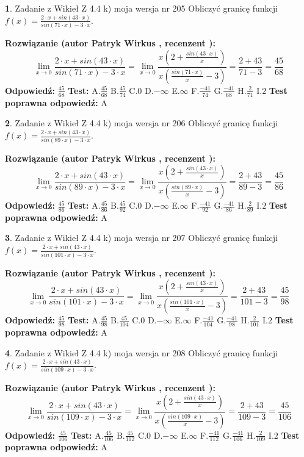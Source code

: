 \documentclass[12pt, a4paper]{article}
\theoremstyle{definition} %
\newtheorem{zad}{}
\newcommand{\zadStart}[1]{\begin{zad}#1\newline}
\newcommand{\zadStop}{\end{zad}}
\newcommand{\rozwStart}[2]{\noindent \textbf{Rozwiązanie (autor #1 , recenzent #2): }\newline}
\newcommand{\rozwStop}{\newline}
\newcommand{\odpStart}{\noindent \textbf{Odpowiedź:}\newline}
\newcommand{\odpStop}{\newline}
\newcommand{\testStart}{\noindent \textbf{Test:}\newline}
\newcommand{\testStop}{\newline}
\newcommand{\kluczStart}{\noindent \textbf{Test poprawna odpowiedź:}\newline}
\newcommand{\kluczStop}{\newline}
\begin{document}
\zadStart{Zadanie z Wikieł Z 4.4 k) moja wersja nr 205}
Obliczyć granicę funkcji $f(x)=\frac{2\cdot x +sin(43\cdot x)}{sin(71\cdot x) -3\cdot x}$.
\zadStop
\rozwStart{Patryk Wirkus}{}
$$\lim\limits_{x\to 0}\frac{2\cdot x +sin(43\cdot x)}{sin(71\cdot x) -3\cdot x}
=\lim\limits_{x\to 0}\frac{x(2+\frac{sin(43\cdot x)}{x})}{x(\frac{sin(71\cdot x)}{x}-3)}
=\frac{2+43}{71-3} = \frac{45}{68}$$
\rozwStop
\odpStart
$\frac{45}{68}$
\odpStop
\testStart
A.$\frac{45}{68}$
B.$\frac{45}{74}$
C.$0$
D.$-\infty$
E.$\infty$
F.$\frac{-41}{74}$
G.$\frac{-41}{68}$
H.$\frac{2}{71}$
I.$2$
\testStop
\kluczStart
A
\kluczStop



\zadStart{Zadanie z Wikieł Z 4.4 k) moja wersja nr 206}
Obliczyć granicę funkcji $f(x)=\frac{2\cdot x +sin(43\cdot x)}{sin(89\cdot x) -3\cdot x}$.
\zadStop
\rozwStart{Patryk Wirkus}{}
$$\lim\limits_{x\to 0}\frac{2\cdot x +sin(43\cdot x)}{sin(89\cdot x) -3\cdot x}
=\lim\limits_{x\to 0}\frac{x(2+\frac{sin(43\cdot x)}{x})}{x(\frac{sin(89\cdot x)}{x}-3)}
=\frac{2+43}{89-3} = \frac{45}{86}$$
\rozwStop
\odpStart
$\frac{45}{86}$
\odpStop
\testStart
A.$\frac{45}{86}$
B.$\frac{45}{92}$
C.$0$
D.$-\infty$
E.$\infty$
F.$\frac{-41}{92}$
G.$\frac{-41}{86}$
H.$\frac{2}{89}$
I.$2$
\testStop
\kluczStart
A
\kluczStop



\zadStart{Zadanie z Wikieł Z 4.4 k) moja wersja nr 207}
Obliczyć granicę funkcji $f(x)=\frac{2\cdot x +sin(43\cdot x)}{sin(101\cdot x) -3\cdot x}$.
\zadStop
\rozwStart{Patryk Wirkus}{}
$$\lim\limits_{x\to 0}\frac{2\cdot x +sin(43\cdot x)}{sin(101\cdot x) -3\cdot x}
=\lim\limits_{x\to 0}\frac{x(2+\frac{sin(43\cdot x)}{x})}{x(\frac{sin(101\cdot x)}{x}-3)}
=\frac{2+43}{101-3} = \frac{45}{98}$$
\rozwStop
\odpStart
$\frac{45}{98}$
\odpStop
\testStart
A.$\frac{45}{98}$
B.$\frac{45}{104}$
C.$0$
D.$-\infty$
E.$\infty$
F.$\frac{-41}{104}$
G.$\frac{-41}{98}$
H.$\frac{2}{101}$
I.$2$
\testStop
\kluczStart
A
\kluczStop



\zadStart{Zadanie z Wikieł Z 4.4 k) moja wersja nr 208}
Obliczyć granicę funkcji $f(x)=\frac{2\cdot x +sin(43\cdot x)}{sin(109\cdot x) -3\cdot x}$.
\zadStop
\rozwStart{Patryk Wirkus}{}
$$\lim\limits_{x\to 0}\frac{2\cdot x +sin(43\cdot x)}{sin(109\cdot x) -3\cdot x}
=\lim\limits_{x\to 0}\frac{x(2+\frac{sin(43\cdot x)}{x})}{x(\frac{sin(109\cdot x)}{x}-3)}
=\frac{2+43}{109-3} = \frac{45}{106}$$
\rozwStop
\odpStart
$\frac{45}{106}$
\odpStop
\testStart
A.$\frac{45}{106}$
B.$\frac{45}{112}$
C.$0$
D.$-\infty$
E.$\infty$
F.$\frac{-41}{112}$
G.$\frac{-41}{106}$
H.$\frac{2}{109}$
I.$2$
\testStop
\kluczStart
A
\kluczStop
\end{document}
